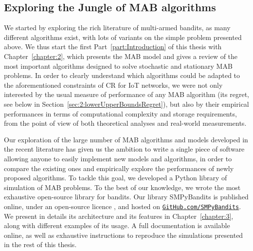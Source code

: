 \subsection{Exploring the Jungle of MAB algorithms}

%
We started by exploring the rich literature of multi-armed bandits,
as many different algorithms exist, with lots of variants on the simple problem presented above.
We thus start the first Part~\ref{part:Introduction} of this thesis with Chapter~\ref{chapter:2}, which presents the MAB model and gives a review of the most important algorithms designed to solve stochastic and stationary MAB problems.
%
In order to clearly understand which algorithms could be adapted to the aforementioned constraints of CR for IoT networks,
we were not only interested by the usual measure of performance of any MAB algorithm (its regret, see below in Section~\ref{sec:2:lowerUpperBoundsRegret}),
but also by their empirical performances in terms of computational complexity and storage requirements, from the point of view of both theoretical analyses and real-world measurements.


%
Our exploration of the large number of MAB algorithms and models developed in the recent literature
has given us the ambition to write a single piece of software allowing anyone to easily implement new models and algorithms, in order to compare the existing ones and empirically explore the performances of newly proposed algorithms.
To tackle this goal, we developed a Python library of simulation of MAB problems.
%
To the best of our knowledge, we wrote the most exhaustive open-source library for bandits. Our library SMPyBandits is published online, under an open-source licence \cite{SMPyBanditsJMLR,SMPyBandits}, and hosted on \href{https://GitHub.com/SMPyBandits}{\texttt{GitHub.com/SMPyBandits}}.
We present in details its architecture and its features in Chapter~\ref{chapter:3}, along with different examples of its usage.
A full documentation is available online, as well as exhaustive instructions to reproduce the simulations presented in the rest of this thesis.


